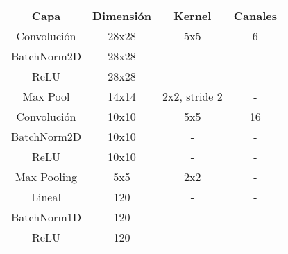 \begin{table}[]
\centering
\begin{tabular}{|c|c|c|c|}
\hline
\multirow{2}{*}{\textbf{Capa}} & \multirow{2}{*}{\textbf{Dimensión}} & \multirow{2}{*}{\textbf{Kernel}} & \multirow{2}{*}{\textbf{Canales}} \\
                               &                                     &                                  &                                   \\ \hline
Convolución                    & 28x28                               & 5x5                              & 6                                 \\ \hline
BatchNorm2D                    & 28x28                               & -                                & -                                 \\ \hline
ReLU                           & 28x28                               & -                                & -                                 \\ \hline
Max Pool                       & 14x14                               & 2x2, stride 2                    & -                                 \\ \hline
Convolución                    & 10x10                               & 5x5                              & 16                                \\ \hline
BatchNorm2D                    & 10x10                               & -                                & -                                 \\ \hline
ReLU                           & 10x10                               & -                                & -                                 \\ \hline
Max Pooling                    & 5x5                                 & 2x2                              & -                                 \\ \hline
Lineal                         & 120                                 & -                                & -                                 \\ \hline
BatchNorm1D                    & 120                                 & -                                & -                                 \\ \hline
ReLU                           & 120                                 & -                                & -                                 \\ \hline

\end{tabular}
\end{table}

